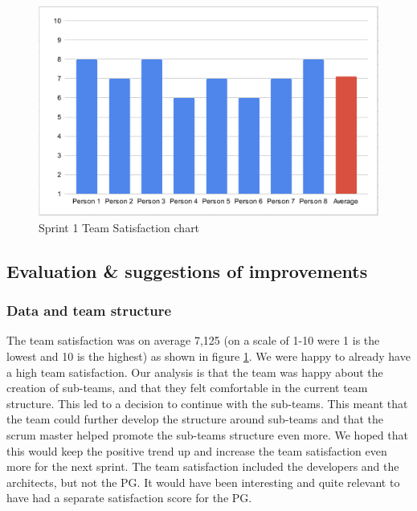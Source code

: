 \documentclass{article}
\begin{document}
\begin{figure}[h!]
    \centering
    \includegraphics[scale=0.6]{pfrFigures/TeamSatisfaction1.png}
    \caption{Sprint 1 Team Satisfaction chart}
    \label{fig:Satisfaction1}
\end{figure}

\subsection{Evaluation \& suggestions of improvements}
\subsubsection{Data and team structure}

The team satisfaction was on average 7,125 (on a scale of 1-10 were 1 is the lowest and 10 is the highest) as shown in figure \ref{fig:Satisfaction1}. We were happy to already have a high team satisfaction. Our analysis is that the team was happy about the creation of sub-teams, and that they felt comfortable in the current team structure. This led to a decision to continue with the sub-teams. This meant that the team could further develop the structure around sub-teams and that the scrum master helped promote the sub-teams structure even more. We hoped that this would keep the positive trend up and increase the team satisfaction even more for the next sprint. The team satisfaction included the developers and the architects, but not the PG. It would have been interesting and quite relevant to have had a separate satisfaction score for the PG.
\end{document}
